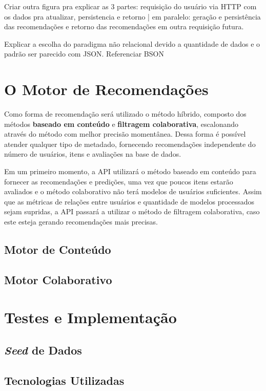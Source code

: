 \documentclass[12pt, openright, oneside, a4paper, brazil]{abntex2}
\begin{document}
Criar outra figura pra explicar as 3 partes: requisição do usuário via HTTP com os dados pra atualizar, persistencia e retorno | em paralelo: geração e persistência das recomendações e retorno das recomendações em outra requisição futura.

Explicar a escolha do paradigma não relacional devido a quantidade de dados e o padrão ser parecido com JSON. Referenciar BSON

\section{O Motor de Recomendações} \label{motor}

Como forma de recomendação será utilizado o método híbrido, composto dos métodos \textbf{baseado em conteúdo} e \textbf{filtragem colaborativa}, escalonando através do método com melhor precisão momentânea. Dessa forma é possível atender qualquer tipo de metadado, fornecendo recomendações independente do número de usuários, itens e avaliações na base de dados.

Em um primeiro momento, a API utilizará o método baseado em conteúdo para fornecer as recomendações e predições, uma vez que poucos itens estarão avaliados e o método colaborativo não terá modelos de usuários suficientes. Assim que as métricas de relações entre usuários e quantidade de modelos processados sejam supridas, a API passará a utilizar o método de filtragem colaborativa, caso este esteja gerando recomendações mais precisas.

\subsection{Motor de Conteúdo} \label{motor:conteudo}

\subsection{Motor Colaborativo} \label{motor:colaborativo}

\section{Testes e Implementação} \label{testes}

\subsection{\textit{Seed} de Dados}

\subsection{Tecnologias Utilizadas} \label{tecnologias}
\end{document}
